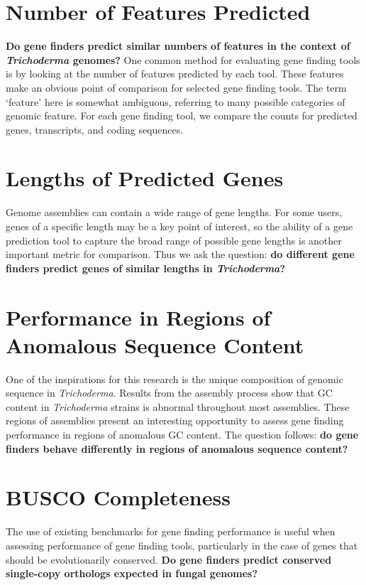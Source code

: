 \section{Number of Features Predicted}

\textbf{Do gene finders predict similar numbers of features in the
  context of \textit{Trichoderma} genomes?} One common method for
evaluating gene finding tools is by looking at the number of features
predicted by each tool. These features make an obvious point of
comparison for selected gene finding tools. The term `feature' here is
somewhat ambiguous, referring to many possible categories of genomic
feature. For each gene finding tool, we compare the counts for
predicted genes, transcripts, and coding sequences.

\section{Lengths of Predicted Genes}

Genome assemblies can contain a wide range of gene lengths. For some
users, genes of a specific length may be a key point of interest, so
the ability of a gene prediction tool to capture the broad range of
possible gene lengths is another important metric for comparison. Thus
we ask the question: \textbf{do different gene finders predict genes
  of similar lengths in \textit{Trichoderma}?}

\section{Performance in Regions of Anomalous Sequence Content}

One of the inspirations for this research is the unique composition of
genomic sequence in \textit{Trichoderma}. Results from the assembly
process show that GC content in \textit{Trichoderma} strains is
abnormal throughout most assemblies. These regions of assemblies
present an interesting opportunity to assess gene finding performance
in regions of anomalous GC content. The question follows: \textbf{do
  gene finders behave differently in regions of anomalous sequence
  content?}

\section{BUSCO Completeness}

The use of existing benchmarks for gene finding performance is useful
when assessing performance of gene finding tools, particularly in the
case of genes that should be evolutionarily conserved. \textbf{Do gene
  finders predict conserved single-copy orthologs expected in fungal
  genomes?}

